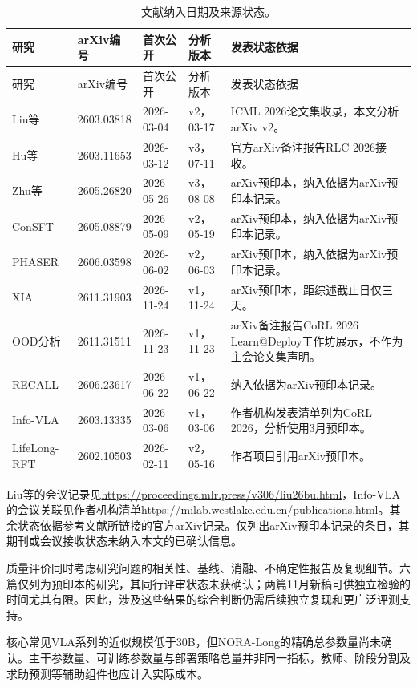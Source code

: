 \documentclass[UTF8,11pt,a4paper,fontset=fandol]{ctexart}
\begin{document}
\begingroup
\footnotesize
\setlength{\tabcolsep}{3.5pt}
\begin{longtable}{@{}p{25mm}p{24mm}p{20mm}p{23mm}p{47mm}@{}}
\caption{文献纳入日期及来源状态。}\label{tab:corpus-zh}\\
\toprule
研究 & arXiv编号 & 首次公开 & 分析版本 & 发表状态依据\\
\midrule
\endfirsthead
\toprule
研究 & arXiv编号 & 首次公开 & 分析版本 & 发表状态依据\\
\midrule
\endhead
\bottomrule
\endfoot
Liu等\cite{liu_er} & 2603.03818 & 2026-03-04 & v2，03-17 & ICML 2026论文集收录，本文分析arXiv v2。\\
Hu等\cite{hu_rl} & 2603.11653 & 2026-03-12 & v3，07-11 & 官方arXiv备注报告RLC 2026接收。\\
Zhu等\cite{zhu_real} & 2605.26820 & 2026-05-26 & v3，08-08 & arXiv预印本，纳入依据为arXiv预印本记录。\\
ConSFT\cite{consft} & 2605.08879 & 2026-05-09 & v2，05-19 & arXiv预印本，纳入依据为arXiv预印本记录。\\
PHASER\cite{phaser} & 2606.03598 & 2026-06-02 & v2，06-03 & arXiv预印本，纳入依据为arXiv预印本记录。\\
XIA\cite{xia} & 2611.31903 & 2026-11-24 & v1，11-24 & arXiv预印本，距综述截止日仅三天。\\
OOD分析\cite{ood} & 2611.31511 & 2026-11-23 & v1，11-23 & arXiv备注报告CoRL 2026 Learn@Deploy工作坊展示，不作为主会论文集声明。\\
RECALL\cite{recall} & 2606.23617 & 2026-06-22 & v1，06-22 & 纳入依据为arXiv预印本记录。\\
Info-VLA\cite{info} & 2603.13335 & 2026-03-06 & v1，03-06 & 作者机构发表清单列为CoRL 2026，分析使用3月预印本。\\
LifeLong-RFT\cite{lifelong} & 2602.10503 & 2026-02-11 & v2，05-16 & 作者项目引用arXiv预印本。\\
\end{longtable}
\endgroup

Liu等的会议记录见\url{https://proceedings.mlr.press/v306/liu26bu.html}，Info-VLA的会议关联见作者机构清单\url{https://milab.westlake.edu.cn/publications.html}。其余状态依据参考文献所链接的官方arXiv记录。仅列出arXiv预印本记录的条目，其期刊或会议接收状态未纳入本文的已确认信息。

质量评价同时考虑研究问题的相关性、基线、消融、不确定性报告及复现细节。六篇仅列为预印本的研究，其同行评审状态未获确认；两篇11月新稿可供独立检验的时间尤其有限。因此，涉及这些结果的综合判断仍需后续独立复现和更广泛评测支持。

核心常见VLA系列的近似规模低于30B，但NORA-Long的精确总参数量尚未确认。主干参数量、可训练参数量与部署策略总量并非同一指标，教师、阶段分割及求助预测等辅助组件也应计入实际成本。



\end{document}
